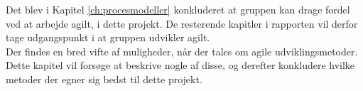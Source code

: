 Det blev i Kapitel \ref{ch:procesmodeller} konkluderet at gruppen kan drage fordel ved at
arbejde agilt, i dette projekt. De resterende kapitler i rapporten vil derfor tage udgangspunkt i at gruppen
udvikler agilt. \\ 

Der findes en bred vifte af muligheder, når der tales om agile udviklingsmetoder. Dette kapitel vil forsøge 
at beskrive nogle af disse, og derefter konkludere hvilke metoder der egner sig bedst til dette projekt.